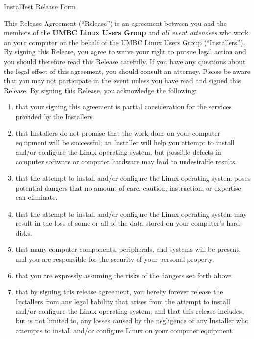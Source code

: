 \documentclass[11pt,draft]{article}
\def\TheRelease{Release}
\def\TheInstallers{Installers}
\def\AnInstaller{Installer}
\begin{document}
\pagestyle{empty}

\begin{center} \LARGE
    Installfest Release Form
\end{center}

\vspace{1em}

This Release Agreement (``\TheRelease'') is an agreement between you and
the members of the \textbf{UMBC Linux Users Group} and \emph{all event
attendees} who work on your computer on the behalf of the UMBC Linux
Users Group (``\TheInstallers''). By signing this Release, you agree to
waive your right to pursue legal action and you should therefore read
this \TheRelease{} carefully. If you have any questions about the legal
effect of this agreement, you should consult an attorney. Please be
aware that you may not participate in the event unless you have read and
signed this \TheRelease. By signing this \TheRelease{}, you acknowledge
the following:

\begin{enumerate}
\item that your signing this agreement is partial consideration for the
    services provided by the \TheInstallers{}.

\item that \TheInstallers{} do not promise that the work done on your
    computer equipment will be successful; an \AnInstaller{} will help
    you attempt to install and/or configure the Linux operating system,
    but possible defects in computer software or computer hardware may
    lead to undesirable results.

\item that the attempt to install and/or configure the Linux operating
    system poses potential dangers that no amount of care, caution,
    instruction, or expertise can eliminate.

\item that the attempt to install and/or configure the Linux operating
    system may result in the loss of some or all of the data stored on
    your computer's hard disks.

\item that many computer components, peripherals, and systems will be
    present, and you are responsible for the security of your personal
    property.

\item that you are expressly assuming the risks of the dangers set forth
    above.

\item that by signing this release agreement, you hereby forever release
    the \TheInstallers{} from any legal liability that arises from the
    attempt to install and/or configure the Linux operating system; and
    that this release includes, but is not limited to, any losses caused
    by the negligence of any \AnInstaller{} who attempts to install
    and/or configure Linux on your computer equipment.

\end{enumerate}
\end{document}
